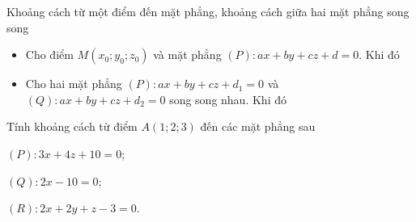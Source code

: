 \begin{dang}{Khoảng cách từ một điểm đến mặt phẳng, khoảng cách giữa hai mặt phẳng song song}
	\begin{itemize}
		\item [\iconMT]  Cho điểm $M(x_0;y_0;z_0)$ và mặt phẳng $(P) \colon ax+by+cz+d=0$. Khi đó
		\item [\iconMT]  	Cho hai mặt phẳng $(P) \colon ax + by + cz + d_1=0$ và $(Q) \colon ax + by + cz + d_2=0$ song song nhau. 
		Khi đó
	\end{itemize}
\end{dang}
\setcounter{ex}{0}
\setcounter{vd}{0}
\begin{vd}%
	Tính khoảng cách từ điểm $A(1;2;3)$ đến các mặt phẳng sau
	\begin{enumEX}[a)]{3}
		\item $\left(P\right) \colon 3x + 4z + 10 = 0$;
		\item $\left(Q\right) \colon 2x - 10 = 0$;
		\item $\left(R\right) \colon 2x + 2y + z - 3 = 0$.
	\end{enumEX}
	
\end{vd}
